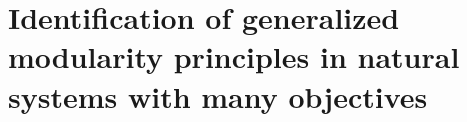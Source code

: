 \chapter{Identification of generalized modularity principles in natural systems with many objectives} \label{ch:hpc}
